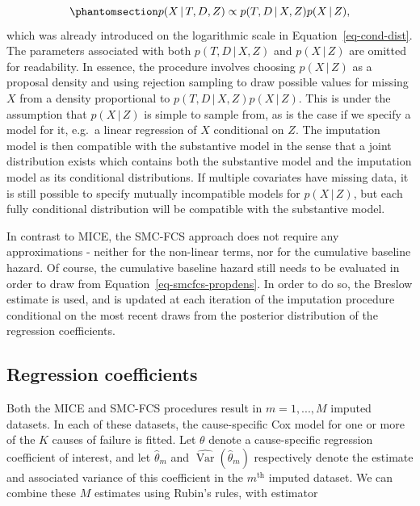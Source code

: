 \documentclass[
  letterpaper,
  DIV=11,
  numbers=noendperiod]{scrreprt}
\DeclareMathOperator{\Var}{Var}
\newcommand{\given}{\,|\,}
\begin{document}
\begin{equation}\phantomsection\label{eq-smcfcs-propdens}{
  p(X \given T, D, Z) \propto p(T,D \given X, Z)p(X \given Z),
}\end{equation} which was already introduced on the logarithmic scale in
Equation~\ref{eq-cond-dist}. The parameters associated with both
\(p(T,D \given X, Z)\) and \(p(X \given Z)\) are omitted for
readability. In essence, the procedure involves choosing
\(p(X \given Z)\) as a proposal density and using rejection sampling to
draw possible values for missing \(X\) from a density proportional to
\(p(T,D \given X, Z)p(X \given Z)\). This is under the assumption that
\(p(X \given Z)\) is simple to sample from, as is the case if we specify
a model for it, e.g.~a linear regression of \(X\) conditional on \(Z\).
The imputation model is then compatible with the substantive model in
the sense that a joint distribution exists which contains both the
substantive model and the imputation model as its conditional
distributions. If multiple covariates have missing data, it is still
possible to specify mutually incompatible models for \(p(X \given Z)\),
but each fully conditional distribution will be compatible with the
substantive model.

In contrast to MICE, the SMC-FCS approach does not require any
approximations - neither for the non-linear terms, nor for the
cumulative baseline hazard. Of course, the cumulative baseline hazard
still needs to be evaluated in order to draw from
Equation~\ref{eq-smcfcs-propdens}. In order to do so, the Breslow
estimate is used, and is updated at each iteration of the imputation
procedure conditional on the most recent draws from the posterior
distribution of the regression coefficients.

\subsection{Regression coefficients}\label{regression-coefficients}

Both the MICE and SMC-FCS procedures result in \(m = 1,...,M\) imputed
datasets. In each of these datasets, the cause-specific Cox model for
one or more of the \(K\) causes of failure is fitted. Let \(\theta\)
denote a cause-specific regression coefficient of interest, and let
\(\hat{\theta}_m\) and \(\widehat{\Var}(\hat{\theta}_m)\) respectively
denote the estimate and associated variance of this coefficient in the
\(m^{\text{th}}\) imputed dataset. We can combine these \(M\) estimates
using Rubin's rules, with estimator
\end{document}
